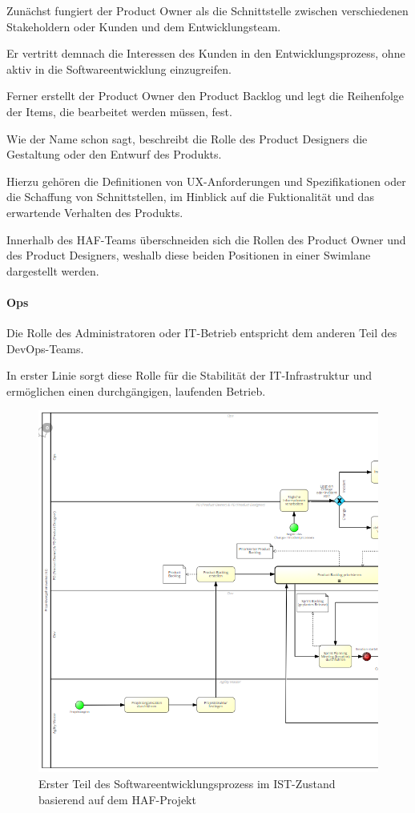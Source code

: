 Zunächst fungiert der Product Owner als die Schnittstelle zwischen verschiedenen Stakeholdern oder Kunden und dem Entwicklungsteam. 

Er vertritt demnach die Interessen des Kunden in den Entwicklungsprozess, ohne aktiv in die Softwareentwicklung einzugreifen.

Ferner erstellt der Product Owner den Product Backlog und legt die Reihenfolge der Items, die bearbeitet werden müssen, fest. 

Wie der Name schon sagt, beschreibt die Rolle des Product Designers die Gestaltung oder den Entwurf des Produkts. 

Hierzu gehören die Definitionen von UX-Anforderungen und Spezifikationen oder die Schaffung von Schnittstellen, im Hinblick auf die Fuktionalität und das erwartende Verhalten des Produkts. 

Innerhalb des HAF-Teams überschneiden sich die Rollen des Product Owner und des Product Designers, weshalb diese beiden Positionen in einer Swimlane dargestellt werden.  

\paragraph{Ops}

Die Rolle des Administratoren oder IT-Betrieb entspricht dem anderen Teil des DevOps-Teams. 

In erster Linie sorgt diese Rolle für die Stabilität der IT-Infrastruktur und ermöglichen einen durchgängigen, laufenden Betrieb.  

\begin{figure}[h]
    \centering
    \includegraphics[scale=0.7]{Bilder/IST-Prozess_first Part.png}
    \caption{Erster Teil des Softwareentwicklungsprozess im IST-Zustand basierend auf dem HAF-Projekt}
\end{figure}

